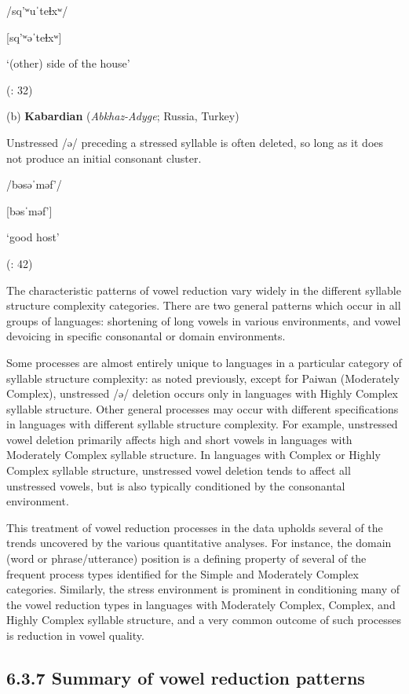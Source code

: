 /sq’ʷuˈteɬxʷ/

[sq’ʷəˈteɬxʷ]

‘(other) side of the house’

(\citealt{ThompsonThompson1992}: 32)

(b)  \textbf{Kabardian} (\textit{Abkhaz-Adyge}; Russia, Turkey) 

Unstressed /ə/ preceding a stressed syllable is often deleted, so long as it does not produce an initial consonant cluster.

/bəsəˈməf’/

[bəsˈməf’]

‘good host’

(\citealt{GordonApplebaum2010}: 42)
\z

  The characteristic patterns of vowel reduction vary widely in the different syllable structure complexity categories. There are two general patterns which occur in all groups of languages: shortening of long vowels in various environments, and vowel devoicing in specific consonantal or domain environments. 

  Some processes are almost entirely unique to languages in a particular category of syllable structure complexity: as noted previously, except for Paiwan (Moderately Complex), unstressed /ə/ deletion occurs only in languages with Highly Complex syllable structure. Other general processes may occur with different specifications in languages with different syllable structure complexity. For example, unstressed vowel deletion primarily affects high and short vowels in languages with Moderately Complex syllable structure. In languages with Complex or Highly Complex syllable structure, unstressed vowel deletion tends to affect all unstressed vowels, but is also typically conditioned by the consonantal environment.

  This treatment of vowel reduction processes in the data upholds several of the trends uncovered by the various quantitative analyses. For instance, the domain (word or phrase/utterance) position is a defining property of several of the frequent process types identified for the Simple and Moderately Complex categories. Similarly, the stress environment is prominent in conditioning many of the vowel reduction types in languages with Moderately Complex, Complex, and Highly Complex syllable structure, and a very common outcome of such processes is reduction in vowel quality.

\subsection{6.3.7 Summary of vowel reduction patterns}

